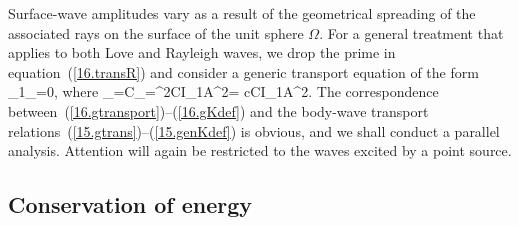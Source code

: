 Surface-wave amplitudes vary as a result of the geometrical spreading
of the associated rays on the surface of the unit sphere $\Omega$.
For a general treatment that applies to both Love and Rayleigh waves,
we drop the prime in equation~(\ref{16.transR}) and consider a generic
transport equation of the form
\eq \label{16.gtransport}
\bdel_1\cdot\bsK_{\Omega}=0,
\en
where
\eq \label{16.gKdef}
\bsK_{\Omega}=C\sE_{\Omega}\bkh=\om^2CI_1A^2\bkh=
\om c\hspace{0.3 mm}CI_1A^2\bk.
\en
The correspondence between~(\ref{16.gtransport})--(\ref{16.gKdef}) and
the body-wave transport relations~(\ref{15.gtrans})--(\ref{15.genKdef})
is obvious, and we shall conduct a parallel analysis.  Attention will
again be restricted to the waves excited by a point source.

\subsection{Conservation of energy}
%
%

